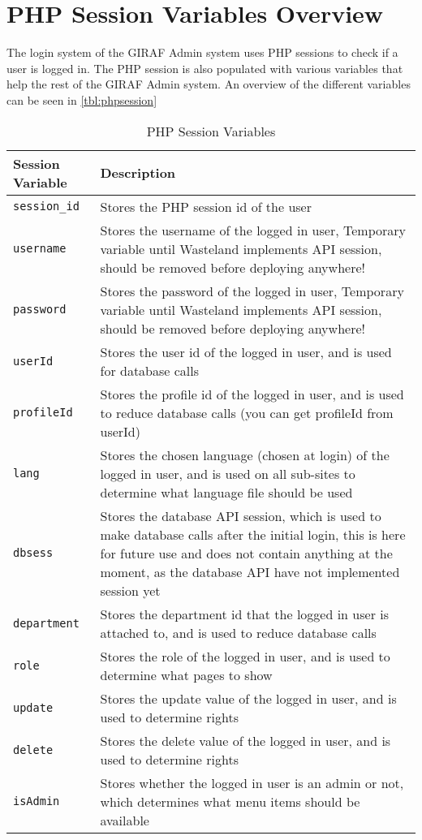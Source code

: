 \section{PHP Session Variables Overview}
\label{sec:phpSesion}
The login system of the GIRAF Admin system uses PHP sessions to check if a user is logged in. The PHP session is also populated with various variables that help the rest of the GIRAF Admin system. An overview of the different variables can be seen in \autoref{tbl:phpsession}
\begin{table}[h]
\begin{tabularx}{\linewidth}{| l | X |}
\hline
Session Variable & Description \\ \hline
\texttt{session\_id} & Stores the PHP session id of the user \\ \hline
\texttt{username} & Stores the username of the logged in user, {\color{red} Temporary variable until Wasteland implements API session, should be removed before deploying anywhere!} \\ \hline
\texttt{password} & Stores the password of the logged in user, {\color{red} Temporary variable until Wasteland implements API session, should be removed before deploying anywhere!} \\ \hline
\texttt{userId} & Stores the user id of the logged in user, and is used for database calls \\ \hline
\texttt{profileId} & Stores the profile id of the logged in user, and is used to reduce database calls (you can get profileId from userId) \\ \hline
\texttt{lang} & Stores the chosen language (chosen at login) of the logged in user, and is used on all sub-sites to determine what language file should be used \\ \hline
\texttt{dbsess} & Stores the database API session, which is used to make database calls after the initial login, {\color{red} this is here for future use and does not contain anything at the moment, as the database API have not implemented session yet} \\ \hline
\texttt{department} & Stores the department id that the logged in user is attached to, and is used to reduce database calls \\ \hline
\texttt{role} & Stores the role of the logged in user, and is used to determine what pages to show \\ \hline
\texttt{update} & Stores the update value of the logged in user, and is used to determine rights \\ \hline
\texttt{delete} & Stores the delete value of the logged in user, and is used to determine rights \\ \hline
\texttt{isAdmin} & Stores whether the logged in user is an admin or not, which determines what menu items should be available \\
\hline
\end{tabularx}
\caption{PHP Session Variables}
\label{tbl:phpsession}
\end{table}
